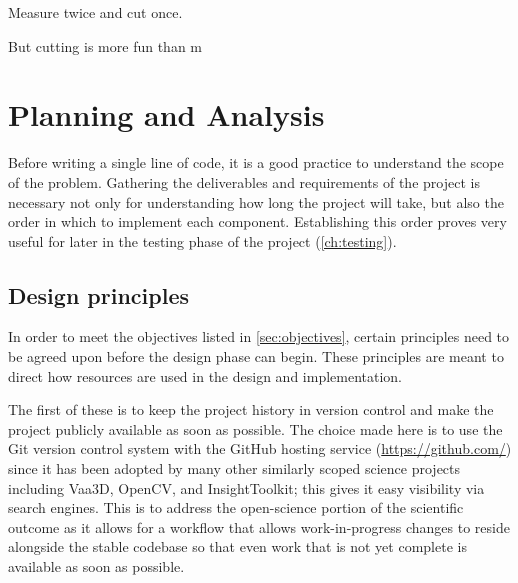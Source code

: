 \begin{savequote}[0.55\linewidth]
	\begin{fancyquote}
		Measure twice and cut once.
	\end{fancyquote}

	\begin{fancyquote}
		But cut\hspace{1em}ting is more fun than m\hspace{0.5em}\raisebox{-0.1em}{eas}\hspace{0.5em}\raisebox{-0.3em}{uri}\hspace{0.5em}\raisebox{-0.5em}{ng!}
	\end{fancyquote}
\end{savequote}

\chapter{Planning and Analysis}\label{ch:analysis}

Before writing a single line of code, it is a good practice to understand the
scope of the problem. Gathering the deliverables and requirements of the
project is necessary not only for understanding how long the project will take,
but also the order in which to implement each component. Establishing this
order proves very useful for later in the testing phase of the project
(\cref{ch:testing}).

\section{Design principles}

In order to meet the objectives listed in \cref{sec:objectives},
certain principles need to be agreed upon before the design phase
can begin. These principles are meant to direct how resources are
used in the design and implementation.

The first of these is to keep the project history in version
control and make the project publicly available as soon as
possible. The choice made here is to use the Git version control
system with the GitHub hosting service (\url{https://github.com/})
since it has been adopted by many other similarly scoped
science projects including Vaa3D, OpenCV, and InsightToolkit; this
gives it easy visibility via search engines. This is to address
the open-science portion of the scientific outcome as it
allows for a workflow that allows work-in-progress changes to
reside alongside the stable codebase so that even work that is not
yet complete is available as soon as possible.

